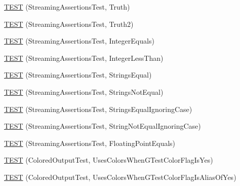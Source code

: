 \begin{DoxyCompactItemize}
\item 
\mbox{\hyperlink{_obj__test_2lib_2googletest-release-1_88_81_2googletest_2test_2gtest__unittest_8cc_a5081f1d21cba3545511f97cc2be73da8}{T\+E\+ST}} (Streaming\+Assertions\+Test, Truth)
\item 
\mbox{\hyperlink{_obj__test_2lib_2googletest-release-1_88_81_2googletest_2test_2gtest__unittest_8cc_aa957aa71ef10bd134fe2d6f702e264df}{T\+E\+ST}} (Streaming\+Assertions\+Test, Truth2)
\item 
\mbox{\hyperlink{_obj__test_2lib_2googletest-release-1_88_81_2googletest_2test_2gtest__unittest_8cc_af9ba09b04506bd0e6b81221396535889}{T\+E\+ST}} (Streaming\+Assertions\+Test, Integer\+Equals)
\item 
\mbox{\hyperlink{_obj__test_2lib_2googletest-release-1_88_81_2googletest_2test_2gtest__unittest_8cc_a8cfc5b3fcdf4593236319966b11dcc52}{T\+E\+ST}} (Streaming\+Assertions\+Test, Integer\+Less\+Than)
\item 
\mbox{\hyperlink{_obj__test_2lib_2googletest-release-1_88_81_2googletest_2test_2gtest__unittest_8cc_a474efe55930f8fc5fa7baa2360d5cda0}{T\+E\+ST}} (Streaming\+Assertions\+Test, Strings\+Equal)
\item 
\mbox{\hyperlink{_obj__test_2lib_2googletest-release-1_88_81_2googletest_2test_2gtest__unittest_8cc_a7393a1560b4cf4ab39cf3eb20ca10345}{T\+E\+ST}} (Streaming\+Assertions\+Test, Strings\+Not\+Equal)
\item 
\mbox{\hyperlink{_obj__test_2lib_2googletest-release-1_88_81_2googletest_2test_2gtest__unittest_8cc_a82bafab19e101ad95823eb58e6676df0}{T\+E\+ST}} (Streaming\+Assertions\+Test, Strings\+Equal\+Ignoring\+Case)
\item 
\mbox{\hyperlink{_obj__test_2lib_2googletest-release-1_88_81_2googletest_2test_2gtest__unittest_8cc_a83a5ce843f2acfe262c164ed6ce989b7}{T\+E\+ST}} (Streaming\+Assertions\+Test, String\+Not\+Equal\+Ignoring\+Case)
\item 
\mbox{\hyperlink{_obj__test_2lib_2googletest-release-1_88_81_2googletest_2test_2gtest__unittest_8cc_a575e502c03840cac57d6dc6697e39240}{T\+E\+ST}} (Streaming\+Assertions\+Test, Floating\+Point\+Equals)
\item 
\mbox{\hyperlink{_obj__test_2lib_2googletest-release-1_88_81_2googletest_2test_2gtest__unittest_8cc_aaf1acc03f393989f85aafd13c880fa44}{T\+E\+ST}} (Colored\+Output\+Test, Uses\+Colors\+When\+G\+Test\+Color\+Flag\+Is\+Yes)
\item 
\mbox{\hyperlink{_obj__test_2lib_2googletest-release-1_88_81_2googletest_2test_2gtest__unittest_8cc_aa9a0db525d07d5e2afea545471d1f654}{T\+E\+ST}} (Colored\+Output\+Test, Uses\+Colors\+When\+G\+Test\+Color\+Flag\+Is\+Alias\+Of\+Yes)

\end{DoxyCompactItemize}

